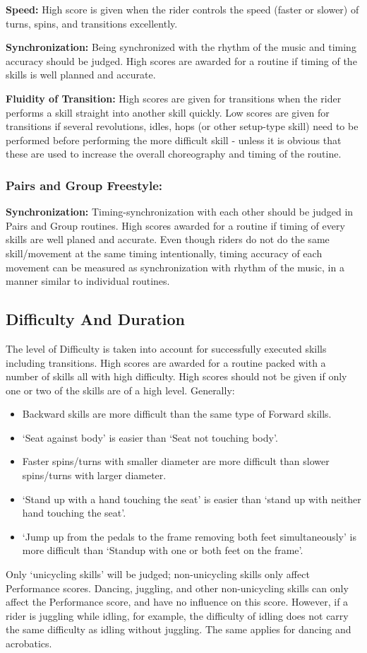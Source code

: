 \textbf{Speed:} High score is given when the rider controls the speed (faster or slower) of turns, spins, and transitions excellently.

\textbf{Synchronization:} Being synchronized with the rhythm of the music and timing accuracy should be judged.
High scores are awarded for a routine if timing of the skills is well planned and accurate.

\textbf{Fluidity of Transition:} High scores are given for transitions when the rider performs a skill straight into another skill quickly.
Low scores are given for transitions if several revolutions, idles, hops (or other setup-type skill) need to be performed before performing the more difficult skill - unless it is obvious that these are used to increase the overall choreography and timing of the routine.

\subsubsection{Pairs and Group Freestyle:}
\textbf{Synchronization:} Timing-synchronization with each other should be judged in Pairs and Group routines.
High scores awarded for a routine if timing of every skills are well planed and accurate.
Even though riders do not do the same skill/movement at the same timing intentionally, timing accuracy of each movement can be measured as synchronization with rhythm of the music, in a manner similar to individual routines.

\subsection{Difficulty And Duration}
The level of Difficulty is taken into account for successfully executed skills including transitions.
High scores are awarded for a routine packed with a number of skills all with high difficulty.
High scores should not be given if only one or two of the skills are of a high level.
Generally:
\begin{itemize}
\item Backward skills are more difficult than the same type of Forward skills.
\item `Seat against body' is easier than `Seat not touching body'.
\item Faster spins/turns with smaller diameter are more difficult than slower spins/turns with larger diameter.
\item `Stand up with a hand touching the seat' is easier than `stand up with neither hand touching the seat'.
\item `Jump up from the pedals to the frame removing both feet simultaneously' is more difficult than `Standup with one or both feet on the frame'.
\end{itemize}
Only `unicycling skills' will be judged; non-unicycling skills only affect Performance scores.
Dancing, juggling, and other non-unicycling skills can only affect the Performance score, and have no influence on this score.
However, if a rider is juggling while idling, for example, the difficulty of idling does not carry the same difficulty as idling without juggling.
The same applies for dancing and acrobatics.

